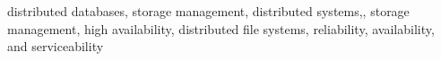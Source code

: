 \documentclass[journal,compsoc]{IEEEtran}
\begin{document}
{\begin{abstract}
\end{abstract}

\begin{IEEEkeywords}
distributed databases, storage management,  distributed systems,, storage management, high availability, distributed file systems,  reliability, availability, and serviceability
\end{IEEEkeywords}}

\maketitle


\IEEEdisplaynontitleabstractindextext

%
\IEEEpeerreviewmaketitle
\end{document}
